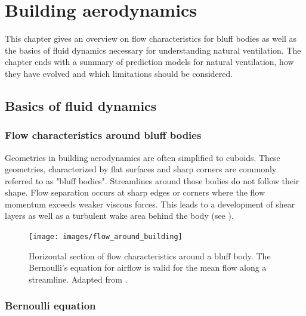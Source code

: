 
\chapter{Building aerodynamics}
\label{chap:building_aerodynamics}

This chapter gives an overview on flow characteristics for bluff bodies as well as the basics of fluid dynamics necessary for understanding natural ventilation. The chapter ends with a summary of prediction models for natural ventilation, how they have evolved and which limitations should be considered.  

%
%


\section{Basics of fluid dynamics}
\label{sec:basic_of_fluid_flow}


\subsection{Flow characteristics around bluff bodies}

Geometries in building aerodynamics are often simplified to cuboids. These geometries, characterized by flat surfaces and sharp corners are commonly referred to as "bluff bodies". Streamlines around those bodies do not follow their shape. Flow separation occurs at sharp edges or corners where the flow momentum exceeds weaker viscous forces. This leads to a development of shear layers as well as a  turbulent wake area behind the body (see ).


\begin{figure}[htb]
	\centering
	\texttt{[image: images/flow\_around\_building]}
	\captionsetup{format=plain}%
	\caption[Flow characteristics around a bluff body]{Horizontal section of flow characteristics around a bluff body. The Bernoulli's equation for airflow is valid for the mean flow along a streamline. Adapted from \cite{Aynsley1999}.}
	\label{fig:flowaroundbuilding}
\end{figure}





\subsection{Bernoulli equation}

